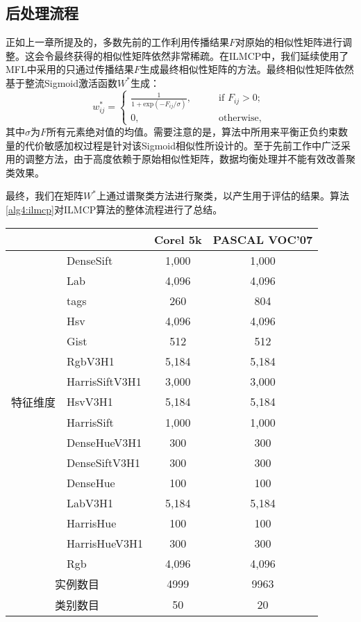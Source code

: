 \subsection{后处理流程}
\label{sec4:sigmoid}
正如上一章所提及的，多数先前的工作利用传播结果$F$对原始的相似性矩阵进行调整。这会令最终获得的相似性矩阵依然非常稀疏。在ILMCP中，我们延续使用了MFL中采用的只通过传播结果$F$生成最终相似性矩阵的方法。最终相似性矩阵依然基于整流Sigmoid激活函数$W^*$生成：
\begin{equation}
{w}^*_{ij} = 
\begin{cases}
\frac{1}{1+\text{exp}(-{F}_{ij}/\sigma)}, \qquad &\text{if }{F}_{ij}>0;\\
0, &\text{otherwise, }
\end{cases}
\label{eq4:sig}
\end{equation}
其中$\sigma$为$F$所有元素绝对值的均值。需要注意的是，算法中所用来平衡正负约束数量的代价敏感加权过程是针对该Sigmoid相似性所设计的。至于先前工作中广泛采用的调整方法，由于高度依赖于原始相似性矩阵，数据均衡处理并不能有效改善聚类效果。

最终，我们在矩阵$W^*$上通过谱聚类方法进行聚类\cite{von2007tutorial}，以产生用于评估的结果。算法\ref{alg4:ilmcp}对ILMCP算法的整体流程进行了总结。


\begin{table}[t]
	\label{tab4:Data}
	\centering
	\setlength{\tabcolsep}{15pt}
	\begin{tabular}{l l c c}
		\toprule
		& & Corel 5k & PASCAL VOC'07\\
		\midrule
		&DenseSift&  1,000 & 1,000 \\
		&Lab&  4,096 & 4,096 \\
		&tags&  260& 804 \\
		&Hsv&  4,096 & 4,096 \\
		&Gist&  512 & 512 \\
		&RgbV3H1&  5,184 & 5,184\\
		&HarrisSiftV3H1&  3,000 & 3,000 \\
		特征维度&HsvV3H1& 5,184 & 5,184\\
		&HarrisSift&  1,000 & 1,000 \\
		&DenseHueV3H1&  300 & 300 \\
		&DenseSiftV3H1&  300 & 300 \\
		&DenseHue&  100 & 100 \\
		&LabV3H1&  5,184 & 5,184 \\
		&HarrisHue&  100 & 100 \\
		&HarrisHueV3H1&  300 & 300 \\
		&Rgb&  4,096 & 4,096 \\
		\midrule
		\multicolumn{2}{c}{实例数目} &4999 & 9963 \\
		\multicolumn{2}{c}{类别数目} &50 & 20 \\
		\bottomrule
	\end{tabular}
\end{table}

